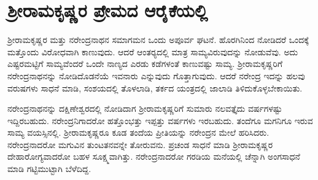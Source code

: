 
\chapter{ಶ‍್ರೀರಾಮಕೃಷ್ಣರ ಪ್ರೇಮದ ಆರೈಕೆಯಲ್ಲಿ }

ಶ‍್ರೀರಾಮಕೃಷ್ಣರ ಮತ್ತು ನರೇಂದ್ರನಾಥನ ಸಮಾಗಮನ ಒಂದು ಅಪೂರ್ವ ಘಟನೆ. ಹೊರಗಿನಿಂದ ನೋಡಿದರೆ ಒಂದಕ್ಕೆ ಮತ್ತೊಂದು ವಿರೋಧವಾಗಿ ಕಾಣುವುದು. ಆದರೆ ಆಂತರ‍್ಯದಲ್ಲಿ ಮಾತ್ರ ಸಾಮ್ಯವಿರುವುದನ್ನು ನೋಡುವೆವು. ಅದು ಎಷ್ಟರಮಟ್ಟಿಗೆ ಸಾಮ್ಯವೆಂದರೆ ಒಂದೇ ನಾಣ್ಯದ ಎರಡು ಕಡೆಗಳಂತೆ ಕಾಣುವಷ್ಟು ಸಾಮ್ಯ. ಶ‍್ರೀರಾಮಕೃಷ್ಣರಿಗೆ ನರೇಂದ್ರನಾಥನನ್ನು ನೋಡಿದೊಡನೆಯೆ ಇವನಾರು ಎನ್ನುವುದು ಗೊತ್ತಾಗುವುದು. ಆದರೆ ನರೇಂದ್ರ ಇದನ್ನು ಹಲವು ವರುಷಗಳು ಸಾಧನೆ ಮಾಡಿ, ಸಂಶಯದಲ್ಲಿ ತೊಳಲಾಡಿ, ತರ್ಕದ ಯಂತ್ರದಲ್ಲಿ ಜಾಲಾಡಿ ತಿಳಿದುಕೊಳ್ಳಬೇಕಾಯಿತು.

ನರೇಂದ್ರನಾಥನನ್ನು ದಕ್ಷಿಣೇಶ್ವರದಲ್ಲಿ ನೋಡಿದಾಗ ಶ‍್ರೀರಾಮಕೃಷ್ಣರಿಗೆ ಸುಮಾರು ನಲವತ್ತೈದು ವರ್ಷಗಳಷ್ಟು ಇದ್ದಿರಬಹುದು. ನರೇಂದ್ರನಿಗಾದರೋ ಹತ್ತೊಂಭತ್ತು ಇಪ್ಪತ್ತು ವರ್ಷಗಳು ಇರಬಹುದು. ತಂದೆಗೂ ಮಗನಿಗೂ ಇರುವ ಸಾಮ್ಯ ವಯಸ್ಸಿನಲ್ಲಿ. ಶ‍್ರೀರಾಮಕೃಷ್ಣರೂ ಕೂಡ ತಂದೆಯ ಪ್ರೀತಿಯನ್ನು ನರೇಂದ್ರನ ಮೇಲೆ ಹರಿಸಿದರು. ನರೇಂದ್ರನಾದರೋ ಮಗುವಿನ ತುಂಟತನವನ್ನೇ ತೋರುವನು. ಪ್ರಚಂಡ ಸಾಧನೆ ಮಾಡಿ ಶ‍್ರೀರಾಮಕೃಷ್ಣರ ದೇಹಾರೋಗ್ಯವಾದರೋ ಬಹಳ ಸೂಕ್ಷ್ಮವಾಗಿತ್ತು. ನರೇಂದ್ರನಾದರೋ ಗರಡಿಯ ಮನೆಯಲ್ಲಿ ಚೆನ್ನಾಗಿ ಅಂಗಸಾಧನೆ ಮಾಡಿ ಗಟ್ಟಿಮುಟ್ಟಾಗಿ ಬೆಳೆದಿದ್ದ.

